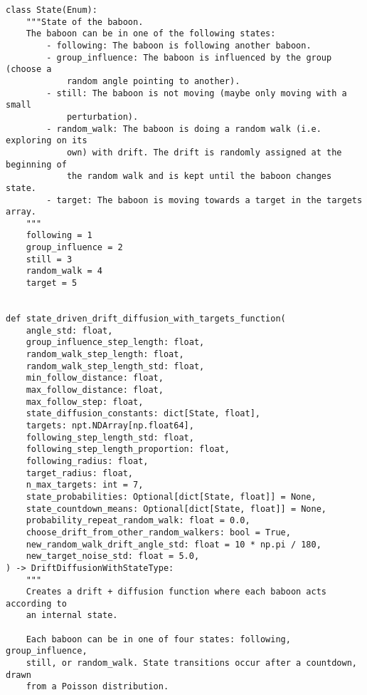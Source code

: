\documentclass[
    article,
    oneside,
]{memoir}
\begin{document}
\begin{verbatim}
class State(Enum):
    """State of the baboon.
    The baboon can be in one of the following states:
        - following: The baboon is following another baboon.
        - group_influence: The baboon is influenced by the group (choose a
            random angle pointing to another).
        - still: The baboon is not moving (maybe only moving with a small
            perturbation).
        - random_walk: The baboon is doing a random walk (i.e. exploring on its
            own) with drift. The drift is randomly assigned at the beginning of
            the random walk and is kept until the baboon changes state.
        - target: The baboon is moving towards a target in the targets array.
    """
    following = 1
    group_influence = 2
    still = 3
    random_walk = 4
    target = 5


def state_driven_drift_diffusion_with_targets_function(
    angle_std: float,
    group_influence_step_length: float,
    random_walk_step_length: float,
    random_walk_step_length_std: float,
    min_follow_distance: float,
    max_follow_distance: float,
    max_follow_step: float,
    state_diffusion_constants: dict[State, float],
    targets: npt.NDArray[np.float64],
    following_step_length_std: float,
    following_step_length_proportion: float,
    following_radius: float,
    target_radius: float,
    n_max_targets: int = 7,
    state_probabilities: Optional[dict[State, float]] = None,
    state_countdown_means: Optional[dict[State, float]] = None,
    probability_repeat_random_walk: float = 0.0,
    choose_drift_from_other_random_walkers: bool = True,
    new_random_walk_drift_angle_std: float = 10 * np.pi / 180,
    new_target_noise_std: float = 5.0,
) -> DriftDiffusionWithStateType:
    """
    Creates a drift + diffusion function where each baboon acts according to
    an internal state.

    Each baboon can be in one of four states: following, group_influence,
    still, or random_walk. State transitions occur after a countdown, drawn
    from a Poisson distribution.


\end{verbatim}
\end{document}
